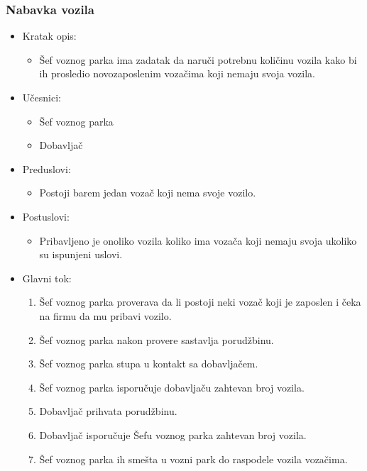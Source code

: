 \subsubsection{\bfseries Nabavka vozila}
\begin{itemize}
	\item Kratak opis:
		\begin{itemize}
			\item Šef voznog parka ima zadatak da naruči potrebnu količinu vozila kako bi ih prosledio novozaposlenim vozačima koji nemaju svoja vozila.
		\end{itemize}

	\item Učesnici:
		\begin{itemize}
		    \item Šef voznog parka
			\item Dobavljač
		\end{itemize}


	\item Preduslovi:
		\begin{itemize}
		    \item Postoji barem jedan vozač koji nema svoje vozilo.
		\end{itemize}


	\item Postuslovi:
		\begin{itemize}
			\item Pribavljeno je onoliko vozila koliko ima vozača koji nemaju svoja ukoliko su ispunjeni uslovi.
	\end{itemize}

	\item Glavni tok:
		\begin{enumerate}
		    \item Šef voznog parka proverava da li postoji neki vozač koji je zaposlen i čeka na firmu da mu pribavi vozilo.
		    \item Šef voznog parka nakon provere sastavlja porudžbinu.
		    \item Šef voznog parka stupa u kontakt sa dobavljačem.
			\item Šef voznog parka isporučuje dobavljaču zahtevan broj vozila.
			\item Dobavljač prihvata porudžbinu.
			\item Dobavljač isporučuje Šefu voznog parka zahtevan broj vozila.
			\item Šef voznog parka ih smešta u vozni park do raspodele vozila vozačima.
		\end{enumerate}


\end{itemize}
